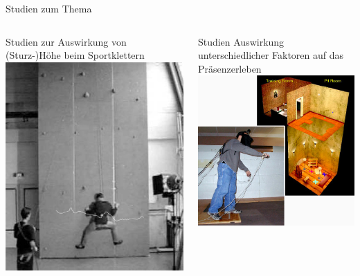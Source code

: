 \begin{frame}{Studien zum Thema}
\begin{columns}
	\begin{column}{0.5\textwidth}
		Studien zur Auswirkung von (Sturz-)Höhe beim Sportklettern
		\autocites{Hardy2007}{Pijpers2006,Pijpers2005,Pijpers2003}
		\includegraphics[width=\columnwidth]{include/images/pijpers.jpg}
	\end{column}
	\begin{column}{0.5\textwidth}
		Studien Auswirkung unterschiedlicher Faktoren auf das Präsenzerleben
		\autocite{Meehan2002,Meehan2001}
		\includegraphics[width=\columnwidth]{include/images/meehan.jpg}

\end{column}
\end{columns}
\end{frame}

